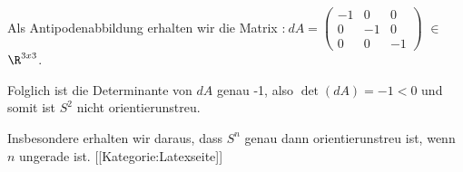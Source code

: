 Als Antipodenabbildung erhalten wir die Matrix
:$
\ dA = \begin{pmatrix}
-1 & 0 & 0 \\
0 & -1 & 0 \\
0 & 0 & -1 \end{pmatrix}
$ $ \in $ $\R^{3x3}$.

Folglich ist die Determinante von $dA$ genau -1, also
 $ \det(dA) = -1 <0$
 und somit ist $S^2$ nicht orientierunstreu.

Insbesondere erhalten wir daraus, dass $S^n$ genau dann orientierunstreu ist, wenn $n$ ungerade ist. [[Kategorie:Latexseite]]

